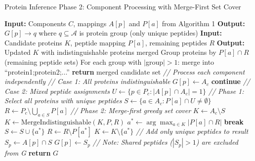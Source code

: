 \documentclass[pdflatex,sn-nature]{sn-jnl}
\begin{document}
\begin{algorithm}[H]
\caption{Protein Inference Phase 2: Component Processing with Merge-First Set Cover}
\begin{algorithmic}[1]
\State \textbf{Input:} Components $C$, mappings $A[p]$ and $P[a]$ from Algorithm 1
\State \textbf{Output:} $G[p] \to q$ where $q \subseteq \mathcal{A}$ is protein group (only unique peptides)
\State
{}
    \State \textbf{Input:} Candidate proteins $K$, peptide mapping $P[a]$, remaining peptides $R$
    \State \textbf{Output:} Updated $K$ with indistinguishable proteins merged
    \State Group proteins by $P[a] \cap R$ (remaining peptide sets)
    \State For each group with $|$group$| > 1$: merge into ``protein1;protein2;...''
    \State \textbf{return} merged candidate set
\EndFunction
\State
\State \textit{// Process each component independently}
    \State
    \State \textit{// Case 1: All proteins indistinguishable}
            \State $G[p] \gets A_c$ 
        \EndFor
        \State \textbf{continue}
    \EndIf
    \State
    \State \textit{// Case 2: Mixed peptide assignments}
    \State $U \gets \{p \in P_c : |A[p] \cap A_c| = 1\}$ 
    \State
    \State \textit{// Phase 1: Select all proteins with unique peptides}
    \State $S \gets \{a \in A_c : P[a] \cap U \neq \emptyset\}$ 
    \State $R \gets P_c \setminus \bigcup_{a \in S} P[a]$ 
    \State
    \State \textit{// Phase 2: Merge-first greedy set cover}
    \State $K \gets A_c \setminus S$ 
        \State $K \gets \text{MergeIndistinguishable}(K, P, R)$ 
        \State $a^* \gets \arg\max_{a \in K} |P[a] \cap R|$ 
            \State \textbf{break}
        \EndIf
        \State $S \gets S \cup \{a^*\}$ 
        \State $R \gets R \setminus P[a^*]$ 
        \State $K \gets K \setminus \{a^*\}$ 
    \EndWhile
    \State
    \State \textit{// Add only unique peptides to result}
        \State $S_p \gets A[p] \cap S$ 
            \State $G[p] \gets S_p$ 
        \EndIf
        \State \textit{// Note: Shared peptides ($|S_p| > 1$) are excluded from G}
    \EndFor
\EndFor
\State
\State \textbf{return} $G$
\end{algorithmic}
\end{algorithm}
\end{document}
